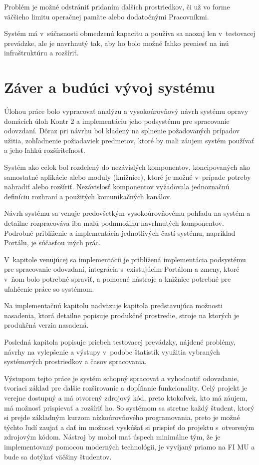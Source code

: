 \documentclass[
  digital, %
  oneside, %
  table,   %
  lof,     %
  lot,   %
]{fithesis3}
\begin{document}
Problém je možné odstrániť pridaním ďalších prostriedkov, či už vo forme väčšieho limitu operačnej pamäte alebo dodatočnými Pracovníkmi.

Systém má v~súčasnosti obmedzenú kapacitu a používa sa naozaj len v~testovacej prevádzke, ale je navrhnutý tak, aby ho bolo možné ľahko preniesť na inú infraštruktúru a rozšíriť.

\chapter{Záver a budúci vývoj systému}

Úlohou práce bolo vypracovať analýzu a vysokoúrovňový návrh systému opravy domácich úloh Kontr 2 a implementáciu jeho podsystému pre spracovanie odovzdaní. 
Dôraz pri návrhu bol kladený na splnenie požadovaných prípadov užitia, zohľadnenie požiadaviek predmetov, ktoré by mali záujem systém používať a jeho ľahkú rozšíriteľnosť.

Systém ako celok bol rozdelený do nezávislých komponentov, koncipovaných ako samostatné aplikácie alebo moduly (knižnice), ktoré je možné v~prípade potreby nahradiť alebo rozšíriť. Nezávislosť komponentov vyžadovala jednoznačnú definíciu rozhraní a použitých komunikačných kanálov.

Návrh systému sa venuje predovšetkým vysokoúrovňovému pohľadu na systém a detailne rozpracováva iba malú podmnožinu navrhnutých komponentov. Podrobné priblíženie a implementácia jednotlivých častí systému, napríklad Portálu, je súčasťou iných prác.

V~kapitole venujúcej sa implementácii je priblížená implementácia podsystému pre spracovanie odovzdaní, integrácia s~existujúcim Portálom a zmeny, ktoré v~ňom bolo potrebné spraviť, a pomocné nástroje a knižnice potrebné pre uľahčenie práce so systémom.

Na implementačnú kapitolu nadväzuje kapitola predstavujúca možnosti nasadenia, ktorá detailne popisuje produkčné prostredie, stroje na ktorých je produkčná verzia nasadená. 

Posledná kapitola popisuje priebeh testovacej prevádzky, nájdené problémy, návrhy na vylepšenie a výstupy v~podobe štatistík využitia vybraných systémových prostriedkov a časov spracovania.

Výstupom tejto práce je systém schopný spracovať a vyhodnotiť odovzdanie, tvoriaci základ pre ďalšie rozširovanie a dopĺňanie funkcionality. Celý projekt je verejne dostupný a má otvorený zdrojový kód, preto ktokoľvek, kto má záujem, má možnosť prispievať a rozšíriť ho. So systémom sa stretne každý študent, ktorý si prejde základným kurzom nízkoúrovňového programovania, preto je možné týchto ľudí zaujať a dať im možnosť vyskúšať si prispieť do projektu s~otvoreným zdrojovým kódom. 
Nástroj by mohol mať úspech minimálne tým, že je implementovaný pomocou moderných technológii, je vyvíjaný priamo na FI MU a bude sa dotýkať väčšiny študentov.
\end{document}
